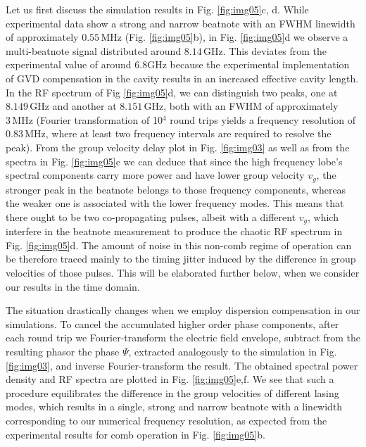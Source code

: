 \documentclass[10pt,letterpaper]{article}%
\begin{document}
Let us first discuss the simulation results in Fig. \ref{fig:img05}c, d. While
experimental data show a strong and narrow beatnote with an FWHM linewidth of
approximately $0.55{\,}\mathrm{MHz}$ (Fig. \ref{fig:img05}b), in Fig.
\ref{fig:img05}d we observe a multi-beatnote signal distributed around
$8.14{\,}\mathrm{GHz}$. This deviates from the experimental value of
around\textrm{ }$6.8${\thinspace}$\mathrm{GHz}$ because the experimental
implementation of GVD compensation in the cavity results in an increased
effective cavity length. In the RF spectrum of Fig \ref{fig:img05}d, we can
distinguish two peaks, one at $8.149{\,}\mathrm{GHz}$ and another at
$8.151{\,}\mathrm{GHz}$, both with an FWHM of approximately $3{\,}%
\mathrm{MHz}$ (Fourier transformation of 10$^{4}$ round trips yields a
frequency resolution of $0.83{\,}\mathrm{MHz}$, where at least two frequency
intervals are required to resolve the peak). From the group velocity delay
plot in Fig. \ref{fig:img03} as well as from the spectra in Fig.
\ref{fig:img05}c we can deduce that since the high frequency lobe's spectral
components carry more power and have lower group velocity $v_{g}$, the
stronger peak in the beatnote belongs to those frequency components, whereas
the weaker one is associated with the lower frequency modes. This means that
there ought to be two co-propagating pulses, albeit with a different $v_{g}$,
which interfere in the beatnote measurement to produce the chaotic RF spectrum
in Fig. \ref{fig:img05}d. The amount of noise in this non-comb regime of
operation can be therefore traced mainly to the timing jitter induced by the
difference in group velocities of those pulses. This will be elaborated
further below, when we consider our results in the time domain.

The situation drastically changes when we employ dispersion compensation in
our simulations. To cancel the accumulated higher order phase components,
after each round trip we Fourier-transform the electric field envelope,
subtract from the resulting phasor the phase $\Psi$, extracted analogously to the simulation
in Fig. \ref{fig:img03}, and inverse Fourier-transform the result. The
obtained spectral power density and RF spectra are plotted in Fig.
\ref{fig:img05}e,f. We see that such a procedure equilibrates the difference
in the group velocities of different lasing modes, which results in a single, strong and narrow beatnote with a linewidth corresponding to our numerical frequency resolution, as expected from the experimental results for comb operation in Fig. \ref{fig:img05}b.
\end{document}
